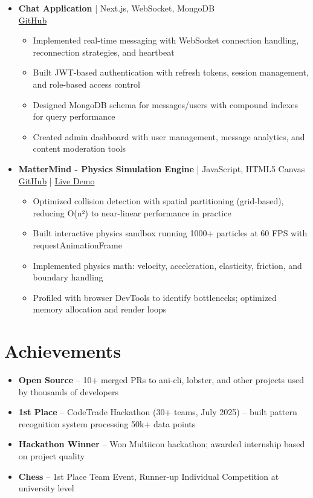 \documentclass[11pt,a4paper]{article}
\newcommand{\resumeItem}[1]{
  \item\small{#1 \vspace{-1pt}}
}
\begin{document}
\begin{itemize}[leftmargin=*]
\item \textbf{Chat Application} | Next.js, WebSocket, MongoDB \\
\href{https://github.com/Dhairya3391/chat-app-next}{GitHub}
\begin{itemize}[leftmargin=*]
\resumeItem{Implemented real-time messaging with WebSocket connection handling, reconnection strategies, and heartbeat}
\resumeItem{Built JWT-based authentication with refresh tokens, session management, and role-based access control}
\resumeItem{Designed MongoDB schema for messages/users with compound indexes for query performance}
\resumeItem{Created admin dashboard with user management, message analytics, and content moderation tools}
\end{itemize}

\item \textbf{MatterMind - Physics Simulation Engine} | JavaScript, HTML5 Canvas \\
\href{https://github.com/Dhairya3391/MatterMind}{GitHub} | \href{https://matter-mind-aanocwu5z-dhairya3391s-projects.vercel.app/}{Live Demo}
\begin{itemize}[leftmargin=*]
\resumeItem{Optimized collision detection with spatial partitioning (grid-based), reducing O(n²) to near-linear performance in practice}
\resumeItem{Built interactive physics sandbox running 1000+ particles at 60 FPS with requestAnimationFrame}
\resumeItem{Implemented physics math: velocity, acceleration, elasticity, friction, and boundary handling}
\resumeItem{Profiled with browser DevTools to identify bottlenecks; optimized memory allocation and render loops}
\end{itemize}

\end{itemize}

\section{Achievements}
\begin{itemize}[leftmargin=*]
\resumeItem{\textbf{Open Source} -- 10+ merged PRs to ani-cli, lobster, and other projects used by thousands of developers}
\resumeItem{\textbf{1st Place} -- CodeTrade Hackathon (30+ teams, July 2025) -- built pattern recognition system processing 50k+ data points}
\resumeItem{\textbf{Hackathon Winner} -- Won Multiicon hackathon; awarded internship based on project quality}
\resumeItem{\textbf{Chess} -- 1st Place Team Event, Runner-up Individual Competition at university level}
\end{itemize}
\end{document}
